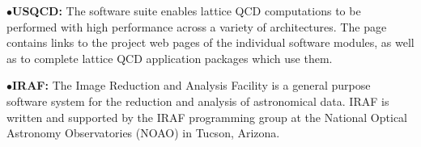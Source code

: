 \medskip

\item{$\bullet$}{\bf USQCD:} 
The software suite enables lattice QCD computations to be performed with high performance across a variety of architectures. The page contains links to the project web pages of the individual software modules, as well as to complete lattice QCD application packages which use them.
	\item{}

\medskip







\medskip
\medskip

%

\medskip

\item{$\bullet$}{\bf IRAF:} 
The Image Reduction and Analysis Facility is a general purpose software system for the reduction and analysis of astronomical data. IRAF is written and supported by the IRAF programming group at the National Optical Astronomy Observatories (NOAO) in Tucson, Arizona.
	\item{}

